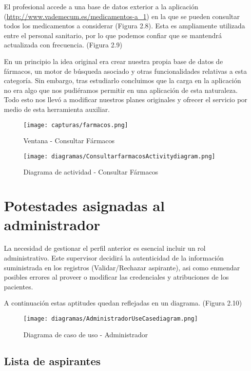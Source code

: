 \documentclass[11pt,spanish,
		listoftables,listoffigures]
		{tfgplantilla}
\begin{document}
El profesional accede a una base de datos exterior a la aplicación (\url {http://www.vademecum.es/medicamentos-a_1}) en la que se pueden consultar todos los medicamentos a considerar (Figura 2.8). Esta es ampliamente utilizada entre el personal sanitario, por lo que podemos confiar que se mantendrá actualizada con frecuencia. (Figura 2.9)

En un principio la idea original era crear nuestra propia base de datos de fármacos, un motor de búsqueda asociado y otras funcionalidades relativas a esta categoría. Sin embargo, tras estudiarlo concluimos que la carga en la aplicación no era algo que nos pudiéramos permitir en una aplicación de esta naturaleza. Todo esto nos llevó a modificar nuestros planes originales y ofrecer el servicio por medio de esta herramienta auxiliar.

\begin{figure}[H]
\centering
\texttt{[image: capturas/farmacos.png]}
\caption{Ventana - Consultar Fármacos}
\end{figure}

\begin{figure}[H]
\centering
\texttt{[image: diagramas/ConsultarfarmacosActivitydiagram.png]}
\caption{Diagrama de actividad -  Consultar Fármacos}
\end{figure}

\vfill
\section {Potestades asignadas al administrador}
La necesidad de gestionar el perfil anterior es esencial incluir un rol administrativo. Este supervisor decidirá la autenticidad de la información suministrada en los registros (Validar/Rechazar aspirante), asi como enmendar posibles errores al proveer o modificar las credenciales y atribuciones de los pacientes.

A continuación estas aptitudes quedan reflejadas en un diagrama. (Figura 2.10)

\begin{landscape}
	\begin{figure}[H]
	\centering
	\texttt{[image: diagramas/AdministradorUseCasediagram.png]}
	\caption{Diagrama de caso de uso - Administrador}
	\end{figure}
\end{landscape}

\vfill
\subsection {Lista de aspirantes}
\end{document}
